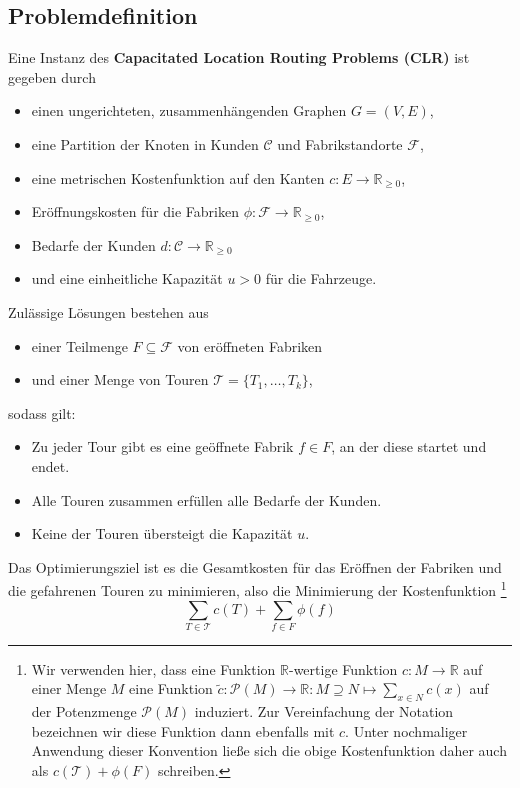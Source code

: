 \documentclass[a4paper,ngerman,11pt,bibtotoc]{scrartcl}
\theoremstyle{definition}
\theoremstyle{plain}
\theoremstyle{remark}
\newcommand{\IR}{\mathbb{R}}
\newcommand{\Tc}{\mathcal{T}}
\newcommand{\ClientSet}{\mathscr{C}}
\newcommand{\FacilitySet}{\mathscr{F}}
\newcommand{\CLR}{CLR}
\begin{document}
	\subsection{Problemdefinition}

Eine Instanz des \textbf{Capacitated Location Routing Problems (\CLR)} ist gegeben durch
\begin{itemize}
	\item einen ungerichteten, zusammenhängenden Graphen $G =(V,E)$,
	\item eine Partition der Knoten in Kunden $\ClientSet$ und Fabrikstandorte $\FacilitySet$,
	\item eine metrischen Kostenfunktion auf den Kanten $c: E \to \IR_{\geq 0}$,
	\item Eröffnungskosten für die Fabriken $\phi: \FacilitySet \to \IR_{\geq 0}$,
	\item Bedarfe der Kunden $d: \ClientSet \to \IR_{\geq 0}$
	\item und eine einheitliche Kapazität $u > 0$ für die Fahrzeuge.		
\end{itemize}
Zulässige Lösungen bestehen aus
\begin{itemize}
	\item einer Teilmenge $F \subseteq \FacilitySet$ von eröffneten Fabriken
	\item und einer Menge von Touren $\Tc = \{T_1, \dots, T_k\}$,
\end{itemize}
sodass gilt:
\begin{itemize}
	\item Zu jeder Tour gibt es eine geöffnete Fabrik $f \in F$, an der diese startet und endet.
	\item Alle Touren zusammen erfüllen alle Bedarfe der Kunden.
	\item Keine der Touren übersteigt die Kapazität $u$.
\end{itemize}
Das Optimierungsziel ist es die Gesamtkosten für das Eröffnen der Fabriken und die gefahrenen Touren zu minimieren, also die Minimierung der Kostenfunktion
\footnote{Wir verwenden hier, dass eine Funktion $\IR$-wertige Funktion $c: M \to \IR$ auf einer Menge $M$ eine Funktion $\tilde{c}: \mathcal{P}(M) \to \IR: M \supseteq N \mapsto \sum_{x \in N} c(x)$ auf der Potenzmenge $\mathcal{P}(M)$ induziert. Zur Vereinfachung der Notation bezeichnen wir diese Funktion dann ebenfalls mit $c$. Unter nochmaliger Anwendung dieser Konvention ließe sich die obige Kostenfunktion daher auch als $c(\Tc) + \phi(F)$ schreiben.}
	\[\sum_{T\in\Tc} c(T) + \sum_{f\in F}\phi(f) \]
	
\end{document}
